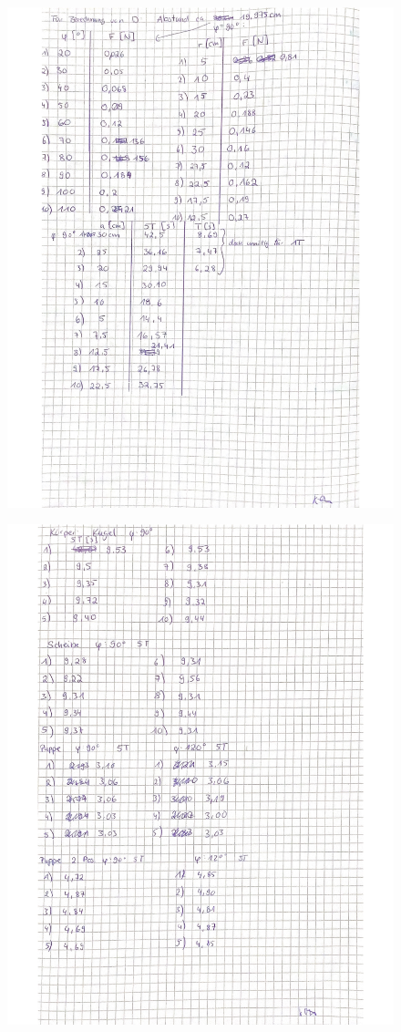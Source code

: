 \begin{figure}[H]
    \includegraphics[width=\textwidth]{Messwerte_2.pdf}
    \label{fig:Messungen_2}
\end{figure}
\begin{figure}[H]
    \includegraphics[width=\textwidth]{Messwerte_3.pdf}
    \label{fig:Messungen_3}
\end{figure}